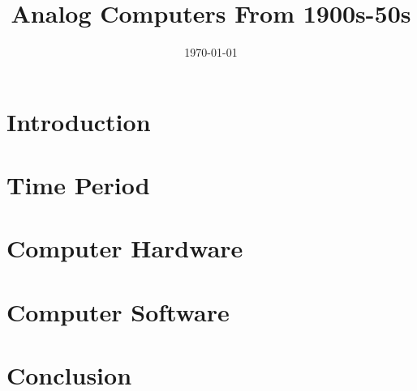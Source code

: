 \documentclass[11pt, twocolumn]{article}
\title{\large \bf \thetitle \LARGE Analog Computers From 1900s-50s}
\author{\theauthor}
\date{\today}
\providecommand{\main}{.}  %
\def\biblio{}
\begin{document}
\def\biblio{}
\maketitle

\section{Introduction}


\section{Time Period}


\section{Computer Hardware}


\section{Computer Software}


\section{Conclusion}




\end{document}
